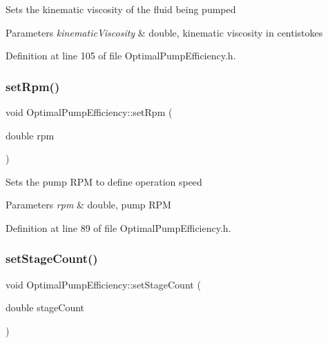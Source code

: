 Sets the kinematic viscosity of the fluid being pumped 
\begin{DoxyParams}{Parameters}
{\em kinematic\+Viscosity} & double, kinematic viscosity in centistokes \\
\hline
\end{DoxyParams}


Definition at line 105 of file Optimal\+Pump\+Efficiency.\+h.

\mbox{\label{class_optimal_pump_efficiency_afc6b6f46b4e289efc8819249ad1c9fb5}} 
\subsubsection{\texorpdfstring{set\+Rpm()}{setRpm()}}
{\footnotesize\ttfamily void Optimal\+Pump\+Efficiency\+::set\+Rpm (\begin{DoxyParamCaption}\item[{double}]{rpm }\end{DoxyParamCaption})\hspace{0.3cm}{\ttfamily [inline]}}

Sets the pump R\+PM to define operation speed 
\begin{DoxyParams}{Parameters}
{\em rpm} & double, pump R\+PM \\
\hline
\end{DoxyParams}


Definition at line 89 of file Optimal\+Pump\+Efficiency.\+h.

\mbox{\label{class_optimal_pump_efficiency_a5b0b2a24a87c1c8fc92aa96c6ba4b727}} 
\subsubsection{\texorpdfstring{set\+Stage\+Count()}{setStageCount()}}
{\footnotesize\ttfamily void Optimal\+Pump\+Efficiency\+::set\+Stage\+Count (\begin{DoxyParamCaption}\item[{double}]{stage\+Count }\end{DoxyParamCaption})\hspace{0.3cm}{\ttfamily [inline]}}

